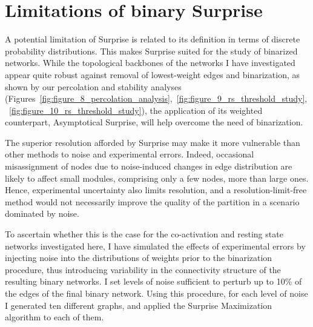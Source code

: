 \section{Limitations of binary Surprise}
A potential limitation of Surprise is related to its definition in terms of discrete probability distributions. This makes Surprise suited for the study of binarized networks. While the topological backbones of the networks I have investigated appear quite robust against removal of lowest-weight edges and binarization, as shown by our percolation and stability analyses (Figures~\ref{fig:figure_8_percolation_analysis},~\ref{fig:figure_9_rs_threshold_study},~\ref{fig:figure_10_rs_threshold_study}), the application of its weighted counterpart, Asymptotical Surprise, will help overcome the need of binarization.

The superior resolution afforded by Surprise may make it more vulnerable than other methods to noise and experimental errors. Indeed, occasional misassignment of nodes due to noise-induced changes in edge distribution are likely to affect small modules, comprising only a few nodes, more than large ones. Hence, experimental uncertainty also limits resolution, and a resolution-limit-free method would not necessarily improve the quality of the partition in a scenario dominated by noise. 

To ascertain whether this is the case for the co-activation and resting state networks investigated here, I have simulated the effects of experimental errors by injecting noise into the distributions of weights prior to the binarization procedure, thus introducing variability in the connectivity structure of the resulting binary networks.
I set levels of noise sufficient to perturb up to 10\% of the edges of the final binary network. Using this procedure, for each level of noise I generated ten different graphs, and applied the Surprise Maximization algorithm to each of them. 

